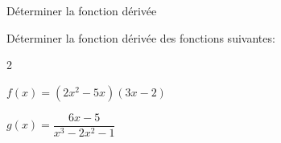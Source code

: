     \begin{bmethodet}{Déterminer la fonction dérivée}
    	
    	Déterminer la fonction dérivée des fonctions suivantes:
    	\begin{multicols}{2}
    		\begin{enumMet}
    			\item $f(x)=\left(2 x^2-5 x\right)(3 x-2)$
    			\item $g(x)=\dfrac{6 x-5}{x^3-2 x^2-1}$
    		\end{enumMet}
    	\end{multicols}
    	
    	\begin{enumMet}
    		\item {}\pointilles[\textwidth-0.5cm]
    		
    		\pointilles[\textwidth-0.5cm]
    		
    		\pointilles[\textwidth-0.5cm]
    		
    		\pointilles[\textwidth-0.5cm]
    		
    		\pointilles[\textwidth-0.5cm]
    		
    		\pointilles[\textwidth-0.5cm]
    		
    		\pointilles[\textwidth-0.5cm]
    		
    		\pointilles[\textwidth-0.5cm]
    		\item {}\pointilles[\textwidth-0.5cm]
    		
    		\pointilles[\textwidth-0.5cm]
    		
    		\pointilles[\textwidth-0.5cm]
    		
    		\pointilles[\textwidth-0.5cm]
    		
    		\pointilles[\textwidth-0.5cm]
    		
    		\pointilles[\textwidth-0.5cm]
    		
    		\pointilles[\textwidth-0.5cm]
    		
    		\pointilles[\textwidth-0.5cm]
    	\end{enumMet}
    \end{bmethodet}
    
